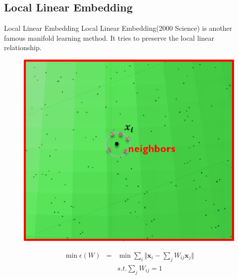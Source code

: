 \documentclass{beamer}
\newcommand{\bol}[1]{\textbf{#1}}
\begin{document}
\begin{darkframes}
    \subsection{Local Linear Embedding}
    \begin{frame}{Local Linear Embedding}
    \alert{Local Linear Embedding}(2000 Science) is another famous manifold learning method. It tries to preserve the local linear relationship.
    \begin{figure}
    \centering
    \includegraphics[scale=0.2]{./figs/fig7.eps}
    \end{figure}
    \vspace{-5mm}
     \begin{eqnarray*}
    	\min\epsilon(W) & = & \min\sum_i\Vert \bol{x}_i - \sum_jW_{ij}\bol{x}_j \Vert \\
    							 &     & s.t. \sum_j W_{ij} = 1
    \end{eqnarray*}
    \end{frame}
    

\end{darkframes}
\end{document}
